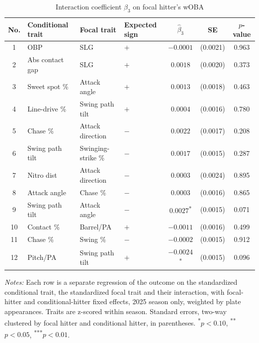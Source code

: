 \begin{table}[htbp]
\centering
\small
\caption{Interaction coefficient $\beta_3$ on focal hitter's wOBA}
\label{tab:table1_woba_2025}
\begin{tabular}{clllccc}
\toprule
No. & Conditional trait & Focal trait & Expected sign & $\hat\beta_3$ & SE & $p$-value \\
\midrule
1 & OBP & SLG & $+$ & $-0.0001$ & (0.0021) & 0.963 \\
2 & Abs contact gap & SLG & $+$ & $0.0018$ & (0.0020) & 0.373 \\
3 & Sweet spot \% & Attack angle & $+$ & $0.0013$ & (0.0018) & 0.463 \\
4 & Line-drive \% & Swing path tilt & $+$ & $0.0004$ & (0.0016) & 0.780 \\
5 & Chase \% & Attack direction & $-$ & $0.0022$ & (0.0017) & 0.208 \\
6 & Swing path tilt & Swinging-strike \% & $-$ & $0.0017$ & (0.0015) & 0.287 \\
7 & Nitro dist & Attack direction & $-$ & $0.0003$ & (0.0024) & 0.895 \\
8 & Attack angle & Chase \% & $-$ & $0.0003$ & (0.0016) & 0.865 \\
9 & Swing path tilt & Attack angle & $-$ & $0.0027$\textsuperscript{*} & (0.0015) & 0.071 \\
10 & Contact \% & Barrel/PA & $+$ & $-0.0011$ & (0.0016) & 0.499 \\
11 & Chase \% & Swing \% & $-$ & $-0.0002$ & (0.0015) & 0.912 \\
12 & Pitch/PA & Swing path tilt & $+$ & $-0.0024$\textsuperscript{*} & (0.0015) & 0.096 \\
\bottomrule
\end{tabular}
\par\smallskip\parbox{0.95\textwidth}{\footnotesize \textit{Notes:} Each row is a separate regression of the outcome on the standardized conditional trait, the standardized focal trait and their interaction, with focal-hitter and conditional-hitter fixed effects, 2025 season only, weighted by plate appearances. Traits are z-scored within season. Standard errors, two-way clustered by focal hitter and conditional hitter, in parentheses. \textsuperscript{*}$p<0.10$, \textsuperscript{**}$p<0.05$, \textsuperscript{***}$p<0.01$.}
\end{table}
